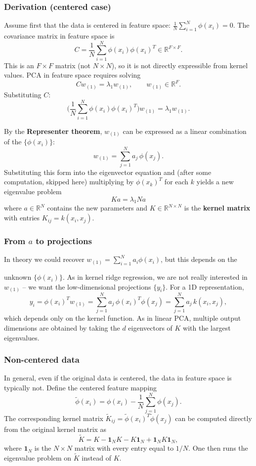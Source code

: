 \subsubsection{Derivation (centered case)}
Assume first that the data is centered in feature space: $\frac{1}{N} \sum_{i=1}^{N} \phi(x_i) = 0$.
The covariance matrix in feature space is
\[
C = \frac{1}{N} \sum_{i=1}^{N} \phi(x_i) \phi(x_i)^T \in \mathbb{R}^{F \times F}.
\]
This is an $F \times F$ matrix (not $N \times N$), so it is not directly expressible from
kernel values. PCA in feature space requires solving
\[
C w_{(1)} = \lambda_1 w_{(1)}, \qquad w_{(1)} \in \mathbb{R}^F.
\]
Substituting $C$:
\[
\biggl(\frac{1}{N} \sum_{i=1}^{N} \phi(x_i) \phi(x_i)^T\biggr) w_{(1)} = \lambda_1 w_{(1)}.
\]

By the \textbf{Representer theorem}, $w_{(1)}$ can be expressed as a linear combination of the
$\{\phi(x_i)\}$:
\[
w_{(1)} = \sum_{j=1}^{N} a_j \, \phi(x_j).
\]
Substituting this form into the eigenvector equation and (after some computation, skipped here)
multiplying by $\phi(x_k)^T$ for each $k$ yields a new eigenvalue problem
\[
\boxed{\, K a = \lambda_1 N a \,}
\]
where $a \in \mathbb{R}^N$ contains the new parameters and $K \in \mathbb{R}^{N \times N}$ is
the \textbf{kernel matrix} with entries $K_{ij} = k(x_i, x_j)$.

\subsubsection{From $a$ to projections}
In theory we could recover $w_{(1)} = \sum_{i=1}^{N} a_i \phi(x_i)$, but this depends on the


unknown $\{\phi(x_i)\}$. As in kernel ridge regression, we are not really interested in
$w_{(1)}$ -- we want the low-dimensional projections $\{y_i\}$. For a 1D representation,
\[
y_i = \phi(x_i)^T w_{(1)} = \sum_{j=1}^{N} a_j \, \phi(x_i)^T \phi(x_j) = \sum_{j=1}^{N} a_j \, k(x_i, x_j),
\]
which depends only on the kernel function. As in linear PCA, multiple output dimensions are
obtained by taking the $d$ eigenvectors of $K$ with the largest eigenvalues.

\subsubsection{Non-centered data}
In general, even if the original data is centered, the data in feature space is typically not.
Define the centered feature mapping
\[
\tilde{\phi}(x_i) = \phi(x_i) - \frac{1}{N} \sum_{j=1}^{N} \phi(x_j).
\]
The corresponding kernel matrix $\tilde{K}_{ij} = \tilde{\phi}(x_i)^T \tilde{\phi}(x_j)$ can be
computed directly from the original kernel matrix as
\[
\tilde{K} = K - \mathbf{1}_N K - K \mathbf{1}_N + \mathbf{1}_N K \mathbf{1}_N,
\]
where $\mathbf{1}_N$ is the $N \times N$ matrix with every entry equal to $1/N$. One then runs
the eigenvalue problem on $\tilde{K}$ instead of $K$.

